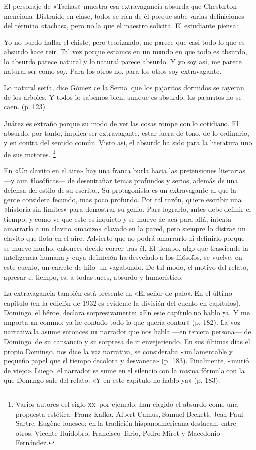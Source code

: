 \documentclass[14pt,twoside,final]{extbook} %
\let\oldfootnote\footnote
\renewcommand\footnote[1]{%
\oldfootnote{\hspace{1mm}#1}}
\begin{document}
El personaje de «Tachas» muestra esa extravagancia absurda que Chesterton menciona. Distraído en clase, todos se ríen de él porque sabe varias definiciones del término «tachas», pero no la que el maestro solicita. El estudiante piensa:
\begin{quoting}
Yo no puedo hallar el chiste, pero teorizando, me parece que casi todo lo que es absurdo hace reír. Tal vez porque estamos en un mundo en que todo es absurdo, lo absurdo parece natural y lo natural parece absurdo. Y yo soy así, me parece natural ser como soy. Para los otros no, para los otros soy extravagante.

Lo natural sería, dice Gómez de la Serna, que los pajaritos dormidos se cayeran de los árboles. Y todos lo sabemos bien, aunque es absurdo, los pajaritos no se caen. (p. 123)
\end{quoting}
Juárez es extraño porque su modo de ver las cosas rompe con lo cotidiano. El absurdo, por tanto, implica ser extravagante, estar fuera de tono, de lo ordinario, y en contra del sentido común. Visto así, el absurdo ha sido para la literatura uno de sus motores.\footnote{Varios autores del siglo \textsc{xx}, por ejemplo, han elegido el absurdo como una propuesta estética: Franz Kafka, Albert Camus, Samuel Beckett, Jean-Paul Sartre, Eugène Ionesco; en la tradición hispanoamericana destacan, entre otros, Vicente Huidobro, Francisco Tario, Pedro Miret y Macedonio Fernández.}

En «Un clavito en el aire» hay una franca burla hacia las pretensiones literarias ---y aun filosóficas--- de desentrañar temas profundos y serios, además de una defensa del estilo de su escritor. Su protagonista es un extravagante al que la gente considera fecundo, mas poco profundo. Por tal razón, quiere escribir una «historia sin límites» para demostrar su genio. Para lograrlo, antes debe definir el tiempo, y como ve que este es inquieto y se mueve de acá para allá, intenta amarrarlo a un clavito «macizo» clavado en la pared, pero siempre lo distrae un clavito que flota en el aire. Advierte que no podrá amarrarlo ni definirlo porque se mueve mucho, entonces decide correr tras él. El tiempo, algo que trasciende la inteligencia humana y cuya definición ha desvelado a los filósofos, se vuelve, en este cuento, un carrete de hilo, un vagabundo. De tal modo, el motivo del relato, apresar el tiempo, es, a todas luces, absurdo y humorístico.

La extravagancia también está presente en «El señor de palo». En el último capítulo (en la edición de 1932 es evidente la división del cuento en capítulos), Domingo, el héroe, declara sorpresivamente: «En este capítulo no hablo ya. Y me importa un comino; ya he contado todo lo que quería contar» (p. 182). La voz narrativa la asume entonces un narrador que nos habla ---en tercera persona--- de Domingo, de su cansancio y su sorpresa de ir envejeciendo. En sus últimos días el propio Domingo, nos dice la voz narrativa, se consideraba «un lamentable y pequeño papel que el tiempo decolora y desvanece» (p. 183). Finalmente, «murió de viejo». Luego, el narrador se sume en el silencio con la misma fórmula con la que Domingo sale del relato: «Y en este capítulo no hablo ya» (p. 183).
\end{document}

